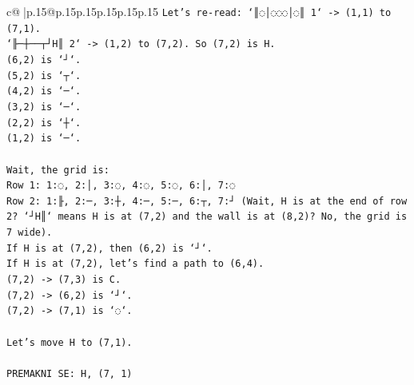 \documentclass{article}
\begin{document}
{\begin{supertabular}{c@{$\;$}|p{.15\linewidth}@{}p{.15\linewidth}p{.15\linewidth}p{.15\linewidth}p{.15\linewidth}p{.15\linewidth}}
{{{\texttt{Let's re{-}read: `║◌│◌◌◌│◌║ 1` {-}> (1,1) to (7,1).} \\
\texttt{`╟─┼──┬┘H║ 2` {-}> (1,2) to (7,2). So (7,2) is H.} \\
\texttt{(6,2) is `┘`.} \\
\texttt{(5,2) is `┬`.} \\
\texttt{(4,2) is `─`.} \\
\texttt{(3,2) is `─`.} \\
\texttt{(2,2) is `┼`.} \\
\texttt{(1,2) is `─`.} \\
\\ 
\texttt{Wait, the grid is:} \\
\texttt{Row 1: 1:◌, 2:│, 3:◌, 4:◌, 5:◌, 6:│, 7:◌} \\
\texttt{Row 2: 1:╟, 2:─, 3:┼, 4:─, 5:─, 6:┬, 7:┘ (Wait, H is at the end of row 2? `┘H║` means H is at (7,2) and the wall is at (8,2)? No, the grid is 7 wide).} \\
\texttt{If H is at (7,2), then (6,2) is `┘`.} \\
\texttt{If H is at (7,2), let's find a path to (6,4).} \\
\texttt{(7,2) {-}> (7,3) is C.} \\
\texttt{(7,2) {-}> (6,2) is `┘`.} \\
\texttt{(7,2) {-}> (7,1) is `◌`.} \\
\\ 
\texttt{Let's move H to (7,1).} \\
\\ 
\texttt{PREMAKNI SE: H, (7, 1)} \\
            }
        }
    }
     \\ \\


\end{supertabular}}
\end{document}
